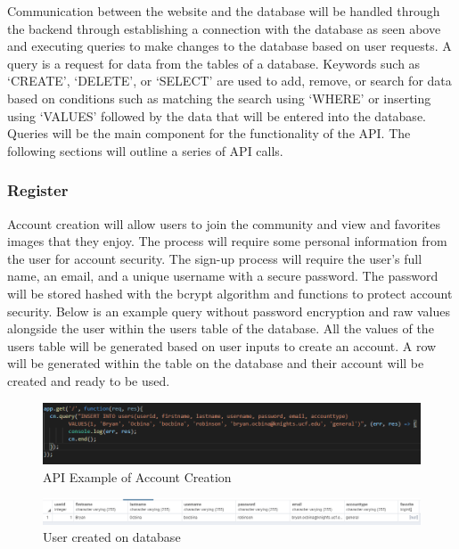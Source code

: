 \documentclass[12pt]{report}
\begin{document}
\begin{enumerate}
Communication between the website and the database will be handled through the backend through establishing a connection with the database as seen above and executing queries to make changes to the database based on user requests.  A query is a request for data from the tables of a database.  Keywords such as ‘CREATE’, ‘DELETE’, or ‘SELECT’ are used to add, remove, or search for data based on conditions such as matching the search using ‘WHERE’ or inserting using ‘VALUES’ followed by the data that will be entered into the database.  Queries will be the main component for the functionality of the API.  The following sections will outline a series of API calls.

\subsubsection*{Register}

Account creation will allow users to join the community and view and favorites images that they enjoy.  The process will require some personal information from the user for account security.  The sign-up process will require the user’s full name, an email, and a unique username with a secure password.  The password will be stored hashed with the bcrypt algorithm and functions to protect account security.  Below is an example query without password encryption and raw values alongside the user within the users table of the database.  All the values of the users table will be generated based on user inputs to create an account.  A row will be generated within the table on the database and their account will be created and ready to be used.

\begin{figure}[h]
	\centering
	\includegraphics[width=\linewidth]{api_raw_register}
	\caption{API Example of Account Creation}
	\label{fig:API Register}
\end{figure}

\begin{figure}[h]
	\centering
	\includegraphics[width=\linewidth]{database_user}
	\caption{User created on database}
	\label{fig:Database User}
\end{figure}


\end{enumerate}
\end{document}
